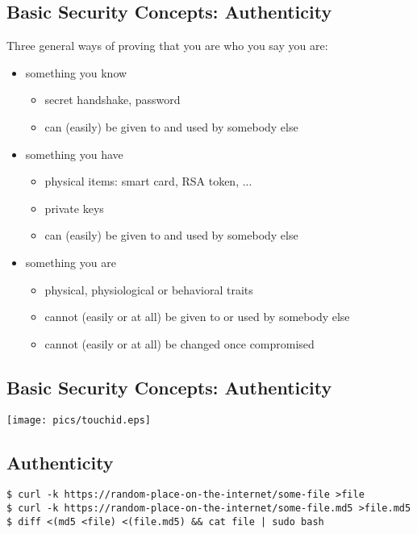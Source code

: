 \documentclass[xga]{xdvislides}
\begin{document}
\subsection{Basic Security Concepts: Authenticity}
Three general ways of proving that you are who you say you are:
\begin{itemize}
	\item something you know
		\begin{itemize}
			\item secret handshake, password
			\item can (easily) be given to and used by somebody else
		\end{itemize}
	\item something you have
		\begin{itemize}
			\item physical items: smart card, RSA token, ...
			\item private keys
			\item can (easily) be given to and used by somebody else
		\end{itemize}
	\item something you are
		\begin{itemize}
			\item physical, physiological or behavioral traits
			\item cannot (easily or at all) be given to or
				used by somebody else
			\item cannot (easily or at all) be changed once
				compromised
		\end{itemize}
\end{itemize}

\subsection{Basic Security Concepts: Authenticity}
\vfill
\begin{center}
	\texttt{[image: pics/touchid.eps]}
\end{center}
\vfill

\subsection{Authenticity}
\begin{verbatim}
$ curl -k https://random-place-on-the-internet/some-file >file
$ curl -k https://random-place-on-the-internet/some-file.md5 >file.md5
$ diff <(md5 <file) <(file.md5) && cat file | sudo bash 
\end{verbatim}
\end{document}
